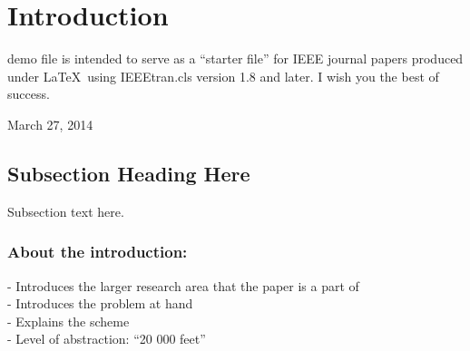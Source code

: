 \section{Introduction}

 demo file is intended to serve as a ``starter file''
for IEEE journal papers produced under \LaTeX\ using
IEEEtran.cls version 1.8 and later. I wish you the best of success.

\hfill March 27, 2014


\subsection{Subsection Heading Here}
Subsection text here.


\subsubsection{About the introduction:}
- Introduces the larger research area that the paper is 
a part of\\
- Introduces the problem at hand\\
- Explains the scheme\\
- Level of abstraction: “20 000 feet”\\